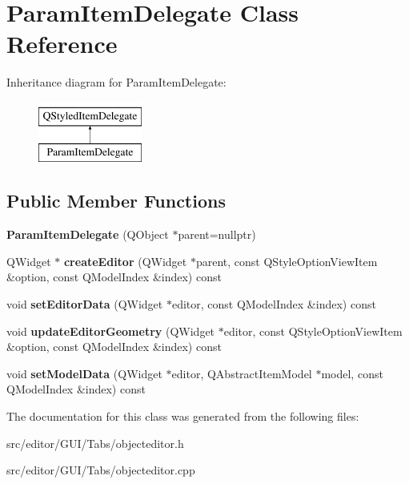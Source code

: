 \hypertarget{class_param_item_delegate}{}\section{Param\+Item\+Delegate Class Reference}
\label{class_param_item_delegate}
Inheritance diagram for Param\+Item\+Delegate\+:\begin{figure}[H]
\begin{center}
\leavevmode
\includegraphics[height=2.000000cm]{class_param_item_delegate}
\end{center}
\end{figure}
\subsection*{Public Member Functions}
\begin{DoxyCompactItemize}
\item 
\hypertarget{class_param_item_delegate_a6acb9a6811ec974fc85697e56ceaec41}{}\label{class_param_item_delegate_a6acb9a6811ec974fc85697e56ceaec41} 
{\bfseries Param\+Item\+Delegate} (Q\+Object $\ast$parent=nullptr)
\item 
\hypertarget{class_param_item_delegate_a4c29dd1f467190ac0680b0ab415be111}{}\label{class_param_item_delegate_a4c29dd1f467190ac0680b0ab415be111} 
Q\+Widget $\ast$ {\bfseries create\+Editor} (Q\+Widget $\ast$parent, const Q\+Style\+Option\+View\+Item \&option, const Q\+Model\+Index \&index) const
\item 
\hypertarget{class_param_item_delegate_a8988b4d5eb51a530f257956418d0d6f0}{}\label{class_param_item_delegate_a8988b4d5eb51a530f257956418d0d6f0} 
void {\bfseries set\+Editor\+Data} (Q\+Widget $\ast$editor, const Q\+Model\+Index \&index) const
\item 
\hypertarget{class_param_item_delegate_a366eab3de525fb4b1175b1f905c2a72b}{}\label{class_param_item_delegate_a366eab3de525fb4b1175b1f905c2a72b} 
void {\bfseries update\+Editor\+Geometry} (Q\+Widget $\ast$editor, const Q\+Style\+Option\+View\+Item \&option, const Q\+Model\+Index \&index) const
\item 
\hypertarget{class_param_item_delegate_ae8acd785b36721cdabfc4842f714f3d6}{}\label{class_param_item_delegate_ae8acd785b36721cdabfc4842f714f3d6} 
void {\bfseries set\+Model\+Data} (Q\+Widget $\ast$editor, Q\+Abstract\+Item\+Model $\ast$model, const Q\+Model\+Index \&index) const
\end{DoxyCompactItemize}


The documentation for this class was generated from the following files\+:\begin{DoxyCompactItemize}
\item 
src/editor/\+G\+U\+I/\+Tabs/objecteditor.\+h\item 
src/editor/\+G\+U\+I/\+Tabs/objecteditor.\+cpp\end{DoxyCompactItemize}
